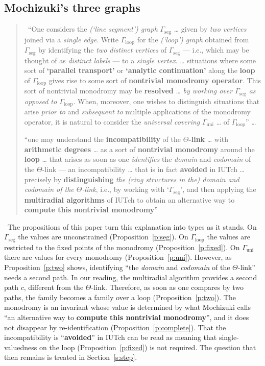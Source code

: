 \documentclass[11pt,a4paper]{article}
\newcommand{\Gseg}{\Gamma_{\mathrm{seg}}}
\newcommand{\Gloop}{\Gamma_{\mathrm{loop}}}
\newcommand{\Guni}{\Gamma_{\mathrm{uni}}}
\newcommand{\lab}[2]{{\upshape\fcolorbox{#1}{#1!8}{\scriptsize\sffamily\bfseries\textcolor{#1}{#2}}}}
\newcommand{\tagS}{\lab{blue}{S}}
\newcommand{\tagH}{\lab{BurntOrange}{H}}
\newcommand{\srcquote}[2]{\begin{quote}\small\tagS\ #1\par\nopagebreak\hfill{\footnotesize #2}\end{quote}}
\newcommand{\q}[1]{``#1''}
\theoremstyle{plain}
\theoremstyle{definition}
\theoremstyle{remark}
\begin{document}
\subsection{Mochizuki's three graphs}
\srcquote{\q{One considers the \emph{(`line segment') graph} $\Gamma_{\mathrm{seg}}$ \dots{} given by \emph{two vertices}
joined via a \emph{single edge}. Write $\Gamma_{\mathrm{loop}}$ for the \emph{(`loop') graph} obtained from
$\Gamma_{\mathrm{seg}}$ by identifying the \emph{two distinct vertices} of $\Gamma_{\mathrm{seg}}$ --- i.e., which may be
thought of as \emph{distinct labels} --- to a \emph{single vertex}. \dots{} situations where some sort of
\textbf{`parallel transport'} or \textbf{`analytic continuation'} along the \textbf{loop} of $\Gamma_{\mathrm{loop}}$ gives
rise to some sort of \textbf{nontrivial monodromy operator}. This sort of nontrivial monodromy may be \textbf{resolved}
\dots{} \emph{by working over $\Gamma_{\mathrm{seg}}$ as opposed to $\Gamma_{\mathrm{loop}}$}. When, moreover, one wishes
to distinguish situations that arise \emph{prior to} and \emph{subsequent to} multiple applications of the monodromy
operator, it is natural to consider the \emph{universal covering} $\Gamma_{\mathrm{uni}}$ \dots{} of
$\Gamma_{\mathrm{loop}}$} \dots\par
\q{one may understand the \textbf{incompatibility} of the \textbf{\boldmath$\Theta$-link} \dots{} with \textbf{arithmetic
degrees} \dots{} as a sort of \textbf{nontrivial monodromy} around the \textbf{loop} \dots{} that arises as soon as one
\emph{identifies} the \emph{domain} and \emph{codomain} of the $\Theta$-link --- an incompatibility \dots{} that is in fact
\textbf{avoided} in IUTch \dots{} precisely by \textbf{distinguishing} \emph{the (ring structures in the) domain and
codomain of the $\Theta$-link}, i.e., by working with `$\Gamma_{\mathrm{seg}}$', and then applying the \textbf{multiradial
algorithms} of IUTch to obtain an alternative way to \textbf{compute this nontrivial monodromy}}}{\cite[\S14,
(LbEx1)]{R18}}

\tagH\ The propositions of this paper turn this explanation into types as it stands. On $\Gseg$ the values are
unconstrained (Proposition~\ref{p:seg}). On $\Gloop$ the values are restricted to the fixed points of the monodromy
(Proposition~\ref{p:fixed}). On $\Guni$ there are values for every monodromy (Proposition~\ref{p:uni}). However, as
Proposition~\ref{p:two} shows, identifying \q{the \emph{domain} and \emph{codomain} of the $\Theta$-link} needs a second
path. In our reading, the multiradial algorithm
provides a second path $c$, different from the $\Theta$-link. Therefore, as soon as one compares by two paths, the
family becomes a family over a loop (Proposition~\ref{p:two}). The monodromy is an invariant whose value is determined
by what Mochizuki calls \q{an alternative way to \textbf{compute this nontrivial monodromy}}, and it does not disappear by
re-identification (Proposition~\ref{p:complete}). That the incompatibility is \q{\textbf{avoided}} in IUTch can be read
as meaning that single-valuedness on the loop (Proposition~\ref{p:fixed}) is not required. The question that then remains is treated in Section~\ref{s:step}.
\end{document}
